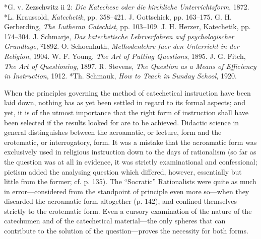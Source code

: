 *G. v. Zezschwitz ii 2: \emph{Die Katechese oder die kirchliche Unterrichtsform}, 1872. *L. Kraussold, \emph{Katechetik}, pp. 358–421. J. Gottschick, pp. 163–175. G. H. Gerberding, \emph{The Lutheran Catechist}, pp. 103–109. J. H. Herzer, Katechetik, pp. 174–304. J. Schmarje, \emph{Das katechetische Lehrverfahren auf psychologischer Grundlage}, ²1892. O. Schoenhuth, \emph{Methodenlehre fuer den Unterricht in der Religion}, 1904. W. F. Young, \emph{The Art of Putting Questions}, 1895. J. G. Fitch, \emph{The Art of Questioning}, 1897. R. Stevens, \emph{The Question as a Means of Efficiency in Instruction}, 1912. *Th. Schmauk, \emph{How to Teach in Sunday School}, 1920.

When the principles governing the method of catechetical instruction have been laid down, nothing has as yet been settled in regard to its formal aspects; and yet, it is of the utmost importance that the right form of instruction shall have been selected if the results looked for are to be achieved. Didactic science in general distinguishes between the acroamatic, or lecture, form and the erotematic, or interrogatory, form. It was a mistake that the acroamatic form was exclusively used in religious instruction down to the days of rationalism (so far as the question was at all in evidence, it was strictly examinational and confessional; pietism added the analysing question which differed, however, essentially but little from the former; cf. p. 135). The “Socratic” Rationalists were quite as much in error—considered from the standpoint of principle even more so—when they discarded the acroamatic form altogether (p. 142), and confined themselves strictly to the erotematic form. Even a cursory examination of the nature of the catechumen and of the catechetical material—the only spheres that can contribute to the solution of the question—proves the necessity for both forms.

